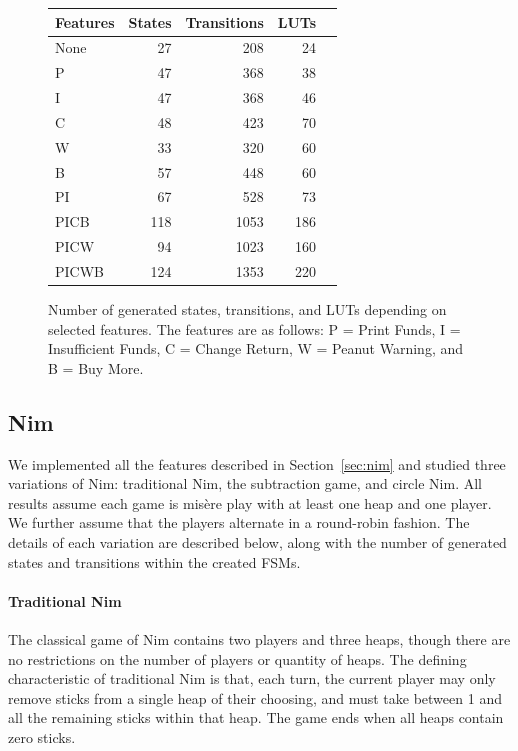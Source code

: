 \documentclass[conference]{IEEEtran}
\begin{document}
\begin{figure}
    \centering
\begin{tabular}{lrrrr}\toprule
Features &States &Transitions &LUTs \\\midrule
None &27 &208 &24 \\
P &47 &368 &38 \\
I &47 &368 &46 \\
C &48 &423 &70 \\
W &33 &320 &60 \\
B &57 &448 &60 \\
PI &67 &528 &73 \\
PICB &118 &1053 &186 \\
PICW &94 &1023 &160 \\
PICWB &124 &1353 &220 \\
\bottomrule
\end{tabular}
    \caption{Number of generated states, transitions, and LUTs depending on selected features. The features are as follows: P = Print Funds, I = Insufficient Funds, C = Change Return, W = Peanut Warning, and B = Buy More.}
    \label{fig:vmData}
\end{figure}

\subsection{Nim}\label{sec:nimresults}

We implemented all the features described in Section~\ref{sec:nim} and studied three variations of Nim: traditional Nim, the subtraction game, and circle Nim. All results assume each game is mis\`{e}re play with at least one heap and one player. We further assume that the players alternate in a round-robin fashion. The details of each variation are described below, along with the number of generated states and transitions within the created FSMs. 

\paragraph{Traditional Nim}
The classical game of Nim contains two players and three heaps, though there are no restrictions on the number of players or quantity of heaps. The defining characteristic of traditional Nim is that, each turn, the current player may only remove sticks from a single heap of their choosing, and must take between 1 and all the remaining sticks within that heap. The game ends when all heaps contain zero sticks. 
\end{document}
